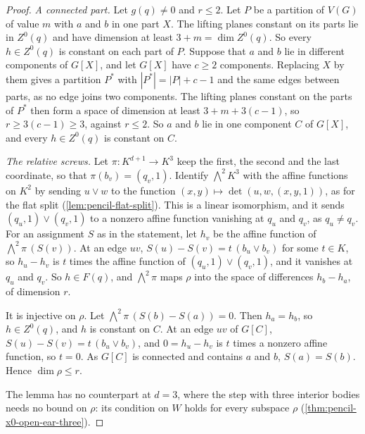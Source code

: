 \begin{proof}
  \emph{A connected part.} Let $g(q) \neq 0$ and $r \le 2$. Let $P$ be a
  partition of $V(G)$ of value $m$ with $a$ and $b$ in one part $X$. The
  lifting planes constant on its parts lie in $Z^0(q)$ and have dimension
  at least $3 + m = \dim Z^0(q)$. So every $h \in Z^0(q)$ is constant on
  each part of $P$. Suppose that $a$ and $b$ lie in different components
  of $G[X]$, and let $G[X]$ have $c \ge 2$ components. Replacing $X$ by
  them gives a partition $P^*$ with $|P^*| = |P| + c - 1$ and the same
  edges between parts, as no edge joins two components. The lifting
  planes constant on the parts of $P^*$ then form a space of dimension at
  least $3 + m + 3(c - 1)$, so $r \ge 3(c - 1) \ge 3$, against
  $r \le 2$. So $a$ and $b$ lie in one component $C$ of $G[X]$, and every
  $h \in Z^0(q)$ is constant on $C$.

  \emph{The relative screws.} Let $\pi \colon K^{d+1} \to K^3$ keep the
  first, the second and the last coordinate, so that
  $\pi(b_v) = (q_v, 1)$. Identify $\bigwedge^2 K^3$ with the affine
  functions on $K^2$ by sending $u \vee w$ to the function
  $(x, y) \mapsto \det(u, w, (x, y, 1))$, as for the flat split
  (\cref{lem:pencil-flat-split}). This is a linear isomorphism, and it
  sends $(q_u, 1) \vee (q_v, 1)$ to a nonzero affine function vanishing
  at $q_u$ and $q_v$, as $q_u \neq q_v$. For an assignment $S$ as in the
  statement, let $h_v$ be the affine function of
  $\bigwedge^2 \pi\, (S(v))$. At an edge $uv$,
  $S(u) - S(v) = t\,(b_u \vee b_v)$ for some $t \in K$, so $h_u - h_v$
  is $t$ times the affine function of $(q_u, 1) \vee (q_v, 1)$, and it
  vanishes at $q_u$ and $q_v$. So $h \in F(q)$, and $\bigwedge^2 \pi$
  maps $\rho$ into the space of differences $h_b - h_a$, of dimension
  $r$.

  It is injective on $\rho$. Let $\bigwedge^2 \pi\,(S(b) - S(a)) = 0$.
  Then $h_a = h_b$, so $h \in Z^0(q)$, and $h$ is constant on $C$. At an
  edge $uv$ of $G[C]$, $S(u) - S(v) = t\,(b_u \vee b_v)$, and
  $0 = h_u - h_v$ is $t$ times a nonzero affine function, so $t = 0$. As
  $G[C]$ is connected and contains $a$ and $b$, $S(a) = S(b)$. Hence
  $\dim \rho \le r$.

  The lemma has no counterpart at $d = 3$, where the step with three
  interior bodies needs no bound on $\rho$: its condition on $W$ holds for
  every subspace $\rho$ (\cref{thm:pencil-x0-open-ear-three}).
\end{proof}

